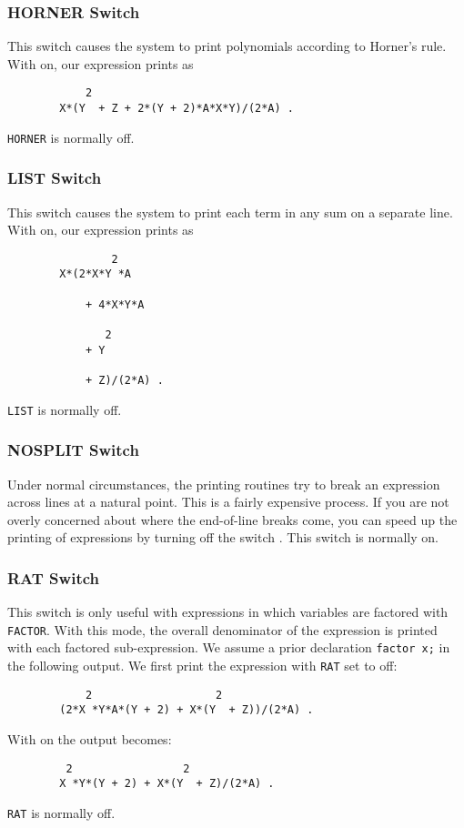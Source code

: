 \subsubsection{HORNER Switch}
\hypertarget{switch:HORNER}{}

This switch causes the system to print polynomials according to Horner's rule.
With  on, our expression prints as
\begin{verbatim}
            2
        X*(Y  + Z + 2*(Y + 2)*A*X*Y)/(2*A) .
\end{verbatim}
\texttt{HORNER} is normally off.

\subsubsection{LIST Switch}
\hypertarget{switch:LIST}{}

This switch causes the system to print each term in any sum on a separate
line. With  on, our expression prints as
\begin{verbatim}
                2
        X*(2*X*Y *A

            + 4*X*Y*A

               2
            + Y

            + Z)/(2*A) .
\end{verbatim}
\texttt{LIST} is normally off.

\subsubsection{NOSPLIT Switch}
\hypertarget{switch:NOSPLIT}{}

Under normal circumstances, the printing routines try to break an expression
across lines at a natural point.  This is a fairly expensive process.  If
you are not overly concerned about where the end-of-line breaks come, you
can speed up the printing of expressions by turning off the switch
.  This switch is normally on.

\subsubsection{RAT Switch}
\hypertarget{switch:RAT}{}

This switch is only useful with expressions in which variables are
factored with \texttt{FACTOR}. With this mode, the overall denominator of the
expression is printed with each factored sub-expression. We assume a prior
declaration \texttt{factor x;} in the following output. We first print the
expression with \texttt{RAT} set to off:
\begin{verbatim}
            2                   2
        (2*X *Y*A*(Y + 2) + X*(Y  + Z))/(2*A) .
\end{verbatim}
With  on the output becomes:
\begin{verbatim}
         2                 2
        X *Y*(Y + 2) + X*(Y  + Z)/(2*A) .
\end{verbatim}
\texttt{RAT} is normally off.

